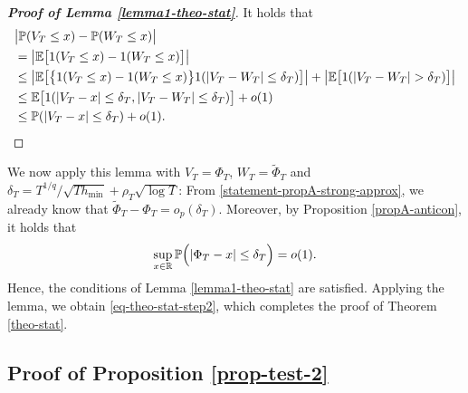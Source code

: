 \begin{proof}[\textnormal{\textbf{Proof of Lemma \ref{lemma1-theo-stat}}}] 
It holds that 
\begin{align*}
 & \big| \mathbb{P}(V_T \le x) - \mathbb{P}(W_T \le x) \big| \\
 & = \big| \mathbb{E} \big[ 1(V_T \le x) - 1(W_T \le x) \big] \big| \\
 & \le \big| \mathbb{E} \big[ \big\{ 1(V_T \le x) - 1(W_T \le x) \big\} 1(|V_T - W_T| \le \delta_T) \big] \big| + \big| \mathbb{E} \big[ 1(|V_T - W_T| > \delta_T) \big] \big| \\
 & \le \mathbb{E} \big[ 1(|V_T - x| \le \delta_T, |V_T - W_T| \le \delta_T) \big] + o(1) \\
 & \le \mathbb{P} (|V_T - x| \le \delta_T) + o(1). \qedhere
\end{align*}
\end{proof}
We now apply this lemma with $V_T = \Phi_T$, $W_T = \widetilde{\Phi}_T$ and $\delta_T = T^{1/q} / \sqrt{T h_{\min}} + \rho_T \sqrt{\log T}$: From \eqref{statement-propA-strong-approx}, we already know that $\widetilde{\Phi}_T - \Phi_T = o_p(\delta_T)$. Moreover, by Proposition \ref{propA-anticon}, it holds that 
\begin{equation}\label{statement-propA-anticon}
\sup_{x \in \mathbb{R}} \mathbb{P} \Big( | \Phi_T - x | \le \delta_T \Big) = o(1). 
\end{equation}
Hence, the conditions of Lemma \ref{lemma1-theo-stat} are satisfied. Applying the lemma, we obtain \eqref{eq-theo-stat-step2}, which completes the proof of Theorem \ref{theo-stat}.



\subsection*{Proof of Proposition \ref{prop-test-2}}


